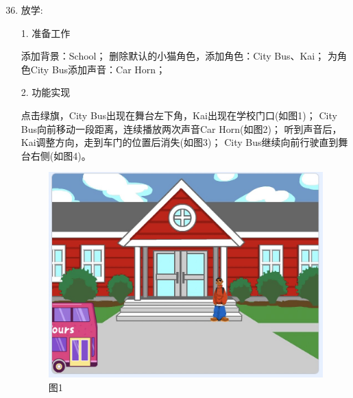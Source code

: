 \documentclass[10pt, a4paper]{article}
\begin{document}
    \begin{enumerate}
        \setcounter{enumi}{35}
        
        \item 放学:
        
        1. 准备工作
        \begin{tasks}[label = (\arabic*)]
            \task 添加背景：School；
            \task 删除默认的小猫角色，添加角色：City Bus、Kai；
            \task 为角色City Bus添加声音：Car Horn；
        \end{tasks}
        2. 功能实现
        \begin{tasks}[label = (\arabic*)]
            \task 点击绿旗，City Bus出现在舞台左下角，Kai出现在学校门口(如图1)；
            \task City Bus向前移动一段距离，连续播放两次声音Car Horn(如图2)；
            \task 听到声音后，Kai调整方向，走到车门的位置后消失(如图3)； 
            \task City Bus继续向前行驶直到舞台右侧(如图4)。
        \end{tasks}
        \begin{figure}[htbp]
            \centering
            \begin{minipage}{.24\textwidth}
                \centering
                \includegraphics[width=\textwidth]{361.jpg}
                \caption*{图1}
            \end{minipage}
            \begin{minipage}{.24\textwidth}
                \centering

\end{minipage}
\end{figure}
\end{enumerate}
\end{document}

